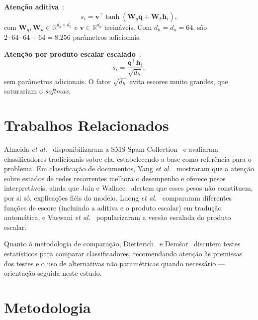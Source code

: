 \documentclass[conference]{IEEEtran}
\begin{document}
\textbf{Atenção aditiva}~\cite{bahdanau2015}:
\begin{equation}
s_i = \mathbf{v}^{\top}\tanh(\mathbf{W}_q\mathbf{q} + \mathbf{W}_k\mathbf{h}_i),
\end{equation}
com $\mathbf{W}_q,\mathbf{W}_k \in \mathbb{R}^{d_a \times d_h}$ e $\mathbf{v} \in \mathbb{R}^{d_a}$ treináveis. Com $d_h = d_a = 64$, são $2 \cdot 64 \cdot 64 + 64 = 8.256$ parâmetros adicionais.

\textbf{Atenção por produto escalar escalado}~\cite{luong2015,vaswani2017}:
\begin{equation}
s_i = \frac{\mathbf{q}^{\top}\mathbf{h}_i}{\sqrt{d_h}},
\end{equation}
sem parâmetros adicionais. O fator $\sqrt{d_h}$ evita escores muito grandes, que saturariam o \textit{softmax}.

\section{Trabalhos Relacionados}
\label{sec:relacionados}

Almeida \textit{et al.}~\cite{almeida2011} disponibilizaram a SMS Spam Collection~\cite{uci_sms} e avaliaram classificadores tradicionais sobre ela, estabelecendo a base como referência para o problema. Em classificação de documentos, Yang \textit{et al.}~\cite{yang2016} mostraram que a atenção sobre estados de redes recorrentes melhora o desempenho e oferece pesos interpretáveis, ainda que Jain e Wallace~\cite{jain2019} alertem que esses pesos não constituem, por si só, explicações fiéis do modelo. Luong \textit{et al.}~\cite{luong2015} compararam diferentes funções de escore (incluindo a aditiva e o produto escalar) em tradução automática, e Vaswani \textit{et al.}~\cite{vaswani2017} popularizaram a versão escalada do produto escalar.

Quanto à metodologia de comparação, Dietterich~\cite{dietterich1998} e Demšar~\cite{demsar2006} discutem testes estatísticos para comparar classificadores, recomendando atenção às premissas dos testes e o uso de alternativas não paramétricas quando necessário --- orientação seguida neste estudo.

\section{Metodologia}
\label{sec:metodologia}
\end{document}
